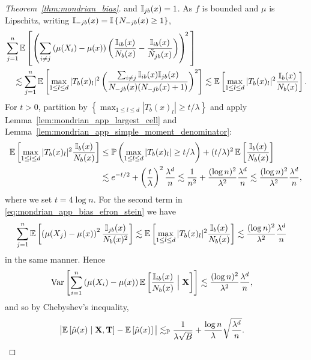 \begin{proof}[Theorem~\ref{thm:mondrian_bias}]
  and $\mathbb{I}_{j b}(x) = 1$.
  As $f$ is bounded and $\mu$ is Lipschitz,
  writing $\mathbb{I}_{-j b}(x) = \mathbb{I} \left\{ N_{-j b}(x) \geq 1 \right\}$,
  \begin{align*}
    &\sum_{j=1}^{n}
    \mathbb{E} \left[
      \left(
        \sum_{i \neq j}
        \left( \mu(X_i) - \mu(x) \right)
        \left(
          \frac{\mathbb{I}_{i b}(x)}{N_b(x)} - \frac{\mathbb{I}_{i b}(x)}{\tilde N_{j b}(x)}
        \right)
      \right)^{\! 2} \,
    \right] \\
    &\quad\lesssim
    \sum_{j=1}^{n}
    \mathbb{E} \left[
      \max_{1 \leq l \leq d}
      |T_b(x)_l|^2
      \left(
        \frac{\sum_{i \neq j}\mathbb{I}_{i b}(x) \mathbb{I}_{j b}(x)}
        {N_{-j b}(x)(N_{-j b}(x) + 1)}
      \right)^2
    \right]
    \lesssim
    \mathbb{E} \left[
      \max_{1 \leq l \leq d}
      |T_b(x)_l|^2
      \frac{\mathbb{I}_{b}(x)}{N_{b}(x)}
    \right].
  \end{align*}
  For $t > 0$, partition by
  $\left\{ \max_{1 \leq l \leq d} |T_b(x)_l| \geq t/\lambda \right\}$
  and apply Lemma~\ref{lem:mondrian_app_largest_cell} and
  Lemma~\ref{lem:mondrian_app_simple_moment_denominator}:
  \begin{align*}
    \mathbb{E} \left[
      \max_{1 \leq l \leq d}
      |T_b(x)_l|^2
      \frac{\mathbb{I}_{b}(x)}{N_{b}(x)}
    \right]
    &\leq
    \mathbb{P} \left(
      \max_{1 \leq l \leq d} |T_b(x)_l| \geq t/\lambda
    \right)
    + (t / \lambda)^2\,
    \mathbb{E} \left[
      \frac{\mathbb{I}_{b}(x)}{N_{b}(x)}
    \right] \\
    &\lesssim
    e^{-t/2}
    + \left( \frac{t}{\lambda} \right)^2
    \frac{\lambda^d}{n}
    \lesssim
    \frac{1}{n^2}
    + \frac{(\log n)^2}{\lambda^2}
    \frac{\lambda^d}{n}
    \lesssim
    \frac{(\log n)^2}{\lambda^2}
    \frac{\lambda^{d}}{n},
  \end{align*}
  where we set $t = 4 \log n$.
  For the second term in \eqref{eq:mondrian_app_bias_efron_stein} we have
  \begin{align*}
    \sum_{j=1}^{n}
    \mathbb{E} \left[
      \left( \mu(X_j) - \mu(x) \right)^2
      \frac{\mathbb{I}_{j b}(x)}{N_b(x)^2}
    \right]
    &\lesssim
    \mathbb{E} \left[
      \max_{1 \leq l \leq d}
      |T_b(x)_l|^{2}
      \frac{\mathbb{I}_{b}(x)}{N_b(x)}
    \right]
    \lesssim
    \frac{(\log n)^2}{\lambda^2}
    \frac{\lambda^{d}}{n}
  \end{align*}
  in the same manner.
  Hence
  \begin{align*}
    \operatorname{Var} \left[
      \sum_{i=1}^{n}
      \left( \mu(X_i) - \mu(x) \right)
      \mathbb{E} \left[
        \frac{\mathbb{I}_{i b}(x)}{N_b(x)}
        \Bigm| \mathbf{X}
      \right]
    \right]
    &\lesssim
    \frac{(\log n)^2}{\lambda^2}
    \frac{\lambda^{d}}{n},
  \end{align*}
  and so by Chebyshev's inequality,
  \begin{align*}
    \big|
    \mathbb{E} \left[ \hat \mu(x) \mid \mathbf{X}, \mathbf{T} \right]
    - \mathbb{E} \left[ \hat \mu(x) \right]
    \big|
    &\lesssim_{\mathbb{P}}
    \frac{1}{\lambda \sqrt B}
    + \frac{\log n}{\lambda}
    \sqrt{ \frac{\lambda^{d}}{n} }.
  \end{align*}


\end{proof}
